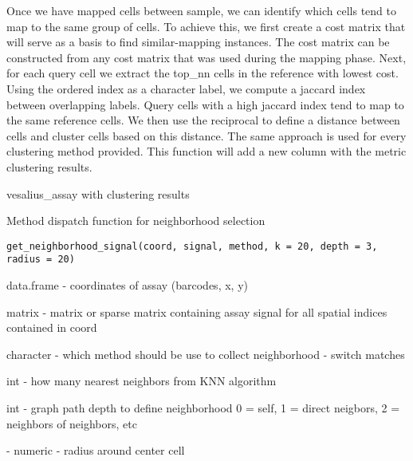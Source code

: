 \documentclass[a4paper]{book}
\begin{document}
\begin{Details}
Once we have mapped cells between sample, we can identify which cells
tend to map to the same group of cells. To achieve this, we first create a 
cost matrix that will serve as a basis to find similar-mapping instances.
The cost matrix can be constructed from any cost matrix that was used during the 
mapping phase. 
Next, for each query cell we extract the top\_nn cells in the reference with lowest
cost. Using the ordered index as a character label, we compute a jaccard index 
between overlapping labels. Query cells with a high jaccard index tend to map 
to the same reference cells. We then use the reciprocal to define a distance between
cells and cluster cells based on this distance.
The same approach is used for every clustering method provided. 
This function will add a new column with the metric clustering results.
\end{Details}
%
\begin{Value}
vesalius\_assay with clustering results
\end{Value}
%
\begin{Description}
Method dispatch function for neighborhood selection
\end{Description}
%
\begin{Usage}
\begin{verbatim}
get_neighborhood_signal(coord, signal, method, k = 20, depth = 3, radius = 20)
\end{verbatim}
\end{Usage}
%
\begin{Arguments}
\begin{ldescription}
\item[\code{coord}] data.frame - coordinates of assay (barcodes, x, y)

\item[\code{signal}] matrix - matrix or sparse matrix containing assay 
signal for all spatial indices contained in coord

\item[\code{method}] character - which method should be use to collect 
neighborhood - switch matches

\item[\code{k}] int - how many nearest neighbors from KNN algorithm

\item[\code{depth}] int - graph path depth to define neighborhood 
0 = self, 1 = direct neigbors, 2 = neighbors of neighbors, etc

\item[\code{radius}] - numeric - radius around center cell
\end{ldescription}
\end{Arguments}
\end{document}
